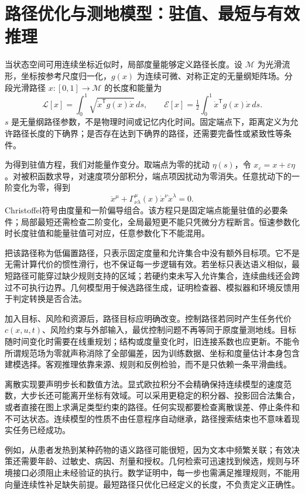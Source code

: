 \section{路径优化与测地模型：驻值、最短与有效推理}
\label{sec:section_6308}

当状态空间可用连续坐标近似时，局部度量能够定义路径长度。设 $\mathcal M$ 为光滑流形，坐标按参考尺度归一化，$g(x)$ 为连续可微、对称正定的无量纲矩阵场。分段光滑路径 $x:[0,1]\to\mathcal M$ 的长度和能量为
\[
\mathcal L[x]=\int_0^1\sqrt{\dot x^{\mathsf T}g(x)\dot x}\,ds,\qquad
\mathcal E[x]=\tfrac12\int_0^1\dot x^{\mathsf T}g(x)\dot x\,ds.
\]
$s$ 是无量纲路径参数，不是物理时间或记忆内化时间。固定端点下，距离定义为允许路径长度的下确界；是否存在达到下确界的路径，还需要完备性或紧致性等条件。

为得到驻值方程，我们对能量作变分。取端点为零的扰动 $\eta(s)$，令 $x_\varepsilon=x+\varepsilon\eta$。对被积函数求导，对速度项分部积分，端点项因扰动为零消失。任意扰动下的一阶变化为零，得到
\[
\ddot x^\mu+\Gamma^\mu_{\nu\lambda}(x)\dot x^\nu\dot x^\lambda=0.
\]
Christoffel符号由度量和一阶偏导组合。该方程只是固定端点能量驻值的必要条件；局部最短还需检查二阶变化，全局最短更不能只凭微分方程断言。恒速参数化时长度驻值和能量驻值可对应，任意参数化下不能混用。

把该路径称为低偏置路径，只表示固定度量和允许集合中没有额外目标项。它不是无需计算代价的惯性滑行，也不保证每一步逻辑有效。若坐标只表达语义相似，最短路径可能穿过缺少规则支持的区域；若硬约束未写入允许集合，连续曲线还会跨过不可执行边界。几何模型用于候选路径生成，证明检查器、模拟器和环境反馈用于判定转换是否合法。

加入目标、风险和资源后，路径目标应明确改变。控制路径若同时产生任务代价 $c(x,u,t)$、风险约束与外部输入，最优控制问题不再等同于原度量测地线。目标随时间变化时需要在线重规划；结构或度量变化时，旧连接系数也应更新。不能令所谓规范场为零就声称消除了全部偏差，因为训练数据、坐标和度量估计本身包含建模选择。客观推理依靠来源、规则和反例检验，而不是只依赖一条平滑曲线。

离散实现要声明步长和数值方法。显式欧拉积分不会精确保持连续模型的速度范数，大步长还可能离开坐标有效域。可以采用更稳定的积分器、投影回合法集合，或者直接在图上求满足类型约束的路径。任何实现都要检查离散误差、停止条件和不可达状态。连续模型的性质不由任意程序自动继承，路径搜索结束也不意味着现实任务已经成功。

例如，从患者发热到某种药物的语义路径可能很短，因为文本中频繁关联；有效决策还需要年龄、过敏史、病因、剂量和授权。几何检索可迅速找到候选，规则与环境接口必须阻止未经验证的执行。数学证明中，每一步也需满足推理规则，不能用向量连续性补足缺失前提。最短路径只优化已经定义的长度，不负责定义正确性。

